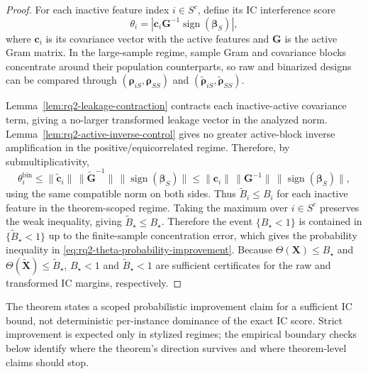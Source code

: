 \begin{proof}
For each inactive feature index $i\in S^c$, define its IC interference score
\begin{equation}\label{eq:rq2-proof-inactive-interference-score}
\theta_i = \left|\mathbf{c}_i\mathbf{G}^{-1}\operatorname{sign}(\boldsymbol{\beta}_S)\right|,
\end{equation}
where $\mathbf{c}_i$ is its covariance vector with the active features and $\mathbf{G}$ is the active Gram matrix. In the large-sample regime, sample Gram and covariance blocks concentrate around their population counterparts, so raw and binarized designs can be compared through $(\boldsymbol{\rho}_{iS},\boldsymbol{\rho}_{SS})$ and $(\tilde{\boldsymbol{\rho}}_{iS},\tilde{\boldsymbol{\rho}}_{SS})$.

Lemma~\ref{lem:rq2-leakage-contraction} contracts each inactive-active covariance term, giving a no-larger transformed leakage vector in the analyzed norm. Lemma~\ref{lem:rq2-active-inverse-control} gives no greater active-block inverse amplification in the positive/equicorrelated regime. Therefore, by submultiplicativity,
\begin{equation}\label{eq:rq2-proof-binarized-interference-bound}
\theta_i^{\text{bin}}
\leq
\|\tilde{\mathbf{c}}_i\|\,\|\tilde{\mathbf{G}}^{-1}\|\,\|\operatorname{sign}(\boldsymbol{\beta}_S)\|
\leq
\|\mathbf{c}_i\|\,\|\mathbf{G}^{-1}\|\,\|\operatorname{sign}(\boldsymbol{\beta}_S)\|,
\end{equation}
using the same compatible norm on both sides. Thus $\tilde{B}_i\leq B_i$ for each inactive feature in the theorem-scoped regime. Taking the maximum over $i\in S^c$ preserves the weak inequality, giving $\tilde{B}_\star\leq B_\star$. Therefore the event $\{B_\star<1\}$ is contained in $\{\tilde{B}_\star<1\}$ up to the finite-sample concentration error, which gives the probability inequality in \eqref{eq:rq2-theta-probability-improvement}. Because $\Theta(\mathbf{X})\leq B_\star$ and $\Theta(\tilde{\mathbf{X}})\leq\tilde{B}_\star$, $B_\star<1$ and $\tilde{B}_\star<1$ are sufficient certificates for the raw and transformed IC margins, respectively.
\end{proof}

The theorem states a scoped probabilistic improvement claim for a sufficient IC bound, not deterministic per-instance dominance of the exact IC score. Strict improvement is expected only in stylized regimes; the empirical boundary checks below identify where the theorem's direction survives and where theorem-level claims should stop.

